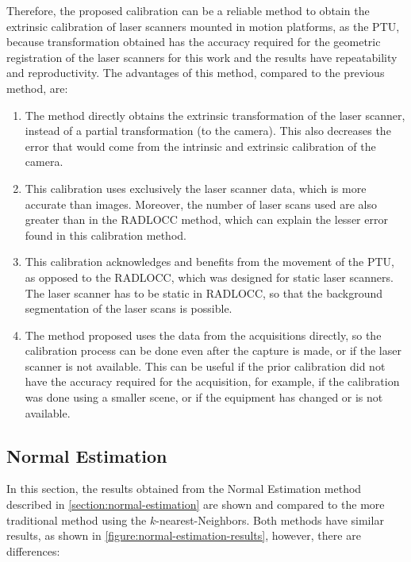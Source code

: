 Therefore, the proposed calibration can be a reliable method to obtain the extrinsic calibration of laser scanners mounted in motion platforms, as the PTU, because transformation obtained has the accuracy required for the geometric registration of the laser scanners for this work and the results have repeatability and reproductivity. The advantages of this method, compared to the previous method, are:

\begin{enumerate}
    \item The method directly obtains the extrinsic transformation of the laser scanner, instead of a partial transformation (to the camera). This also decreases the error that would come from the intrinsic and extrinsic calibration of the camera.
    \item This calibration uses exclusively the laser scanner data, which is more accurate than images. Moreover, the number of laser scans used are also greater than in the RADLOCC method, which can explain the lesser error found in this calibration method.
    \item This calibration acknowledges and benefits from the movement of the PTU, as opposed to the RADLOCC, which was designed for static laser scanners. The laser scanner has to be static in RADLOCC, so that the background segmentation of the laser scans is possible.
    \item The method proposed uses the data from the acquisitions directly, so the calibration process can be done even after the capture is made, or if the laser scanner is not available. This can be useful if the prior calibration did not have the accuracy required for the acquisition, for example, if the calibration was done using a smaller scene, or if the equipment has changed or is not available.
\end{enumerate}

\subsection{Normal Estimation}
\label{section:results-normal-estimation}

In this section, the results obtained from the Normal Estimation method described in \cref{section:normal-estimation} are shown and compared to the more traditional method using the $k$-nearest-Neighbors. Both methods have similar results, as shown in \cref{figure:normal-estimation-results}, however, there are differences:

